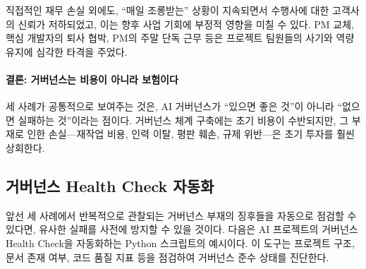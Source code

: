 직접적인 재무 손실 외에도, ``매일 조롱받는'' 상황이 지속되면서 수행사에 대한 고객사의 신뢰가 저하되었고, 이는 향후 사업 기회에 부정적 영향을 미칠 수 있다. PM 교체, 핵심 개발자의 퇴사 협박, PM의 주말 단독 근무 등은 프로젝트 팀원들의 사기와 역량 유지에 심각한 타격을 주었다.

\paragraph{결론: 거버넌스는 비용이 아니라 보험이다}
세 사례가 공통적으로 보여주는 것은, AI 거버넌스가 ``있으면 좋은 것''이 아니라 ``없으면 실패하는 것''이라는 점이다. 거버넌스 체계 구축에는 초기 비용이 수반되지만, 그 부재로 인한 손실---재작업 비용, 인력 이탈, 평판 훼손, 규제 위반---은 초기 투자를 훨씬 상회한다.

\subsection{거버넌스 Health Check 자동화}
\label{sec:1.3.5}

앞선 세 사례에서 반복적으로 관찰되는 거버넌스 부재의 징후들을 자동으로 점검할 수 있다면, 유사한 실패를 사전에 방지할 수 있을 것이다. 다음은 AI 프로젝트의 거버넌스 Health Check을 자동화하는 Python 스크립트의 예시이다. 이 도구는 프로젝트 구조, 문서 존재 여부, 코드 품질 지표 등을 점검하여 거버넌스 준수 상태를 진단한다.

